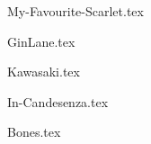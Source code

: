 \begin{songs}{}

  {My-Favourite-Scarlet.tex}
  \sclearpage
  
  {GinLane.tex}
  \sclearpage

  {Kawasaki.tex}
  \sclearpage
  
  {In-Candesenza.tex}
  \sclearpage

  {Bones.tex}

\end{songs}
